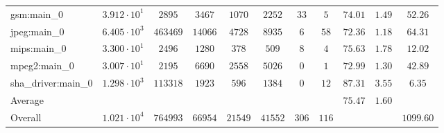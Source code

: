 \begin{tabular}{|l|c|c|c|c|c|c|c|c|c|c|}
gsm:main\_0             & $ 3.912 \cdot 10^{1} $ & $ 2895   $ & $ 3467  $ & $ 1070  $ & $ 2252  $ & $ 33  $ & $ 5   $ & $ 74.01       $ & $ 1.49    $ & $ 52.26   $ \\
jpeg:main\_0            & $ 6.405 \cdot 10^{3} $ & $ 463469 $ & $ 14066 $ & $ 4728  $ & $ 8935  $ & $ 6   $ & $ 58  $ & $ 72.36       $ & $ 1.18    $ & $ 64.31   $ \\
mips:main\_0            & $ 3.300 \cdot 10^{1} $ & $ 2496   $ & $ 1280  $ & $ 378   $ & $ 509   $ & $ 8   $ & $ 4   $ & $ 75.63       $ & $ 1.78    $ & $ 12.02   $ \\
mpeg2:main\_0           & $ 3.007 \cdot 10^{1} $ & $ 2195   $ & $ 6690  $ & $ 2558  $ & $ 5026  $ & $ 0   $ & $ 1   $ & $ 72.99       $ & $ 1.30    $ & $ 42.89   $ \\
sha\_driver:main\_0     & $ 1.298 \cdot 10^{3} $ & $ 113318 $ & $ 1923  $ & $ 596   $ & $ 1384  $ & $ 0   $ & $ 12  $ & $ 87.31       $ & $ 3.55    $ & $ 6.35    $ \\
\hline
Average                 & $                    $ & $        $ & $       $ & $       $ & $       $ & $     $ & $     $ & $ 75.47       $ & $ 1.60    $ & $         $ \\
\hline
Overall                 & $ 1.021 \cdot 10^{4} $ & $ 764993 $ & $ 66954 $ & $ 21549 $ & $ 41552 $ & $ 306 $ & $ 116 $ & $             $ & $         $ & $ 1099.60 $ \\
\hline
\end{tabular}

